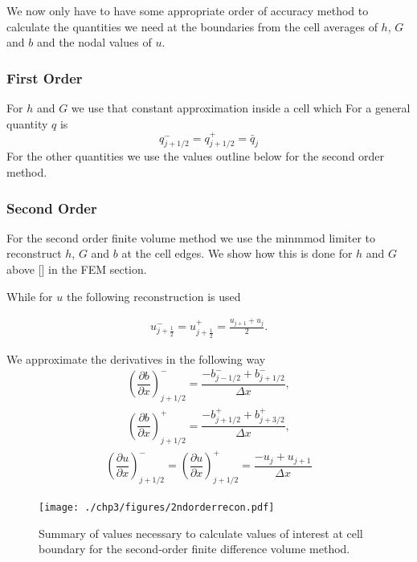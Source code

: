 We now only have to have some appropriate order of accuracy method to calculate the quantities we need at the boundaries from the cell averages of $h$, $G$ and $b$ and the nodal values of $u$.

\subsubsection{First Order}
For $h$ and $G$ we use that constant approximation inside a cell which
For a general quantity $q$ is
\begin{equation}
	q^-_{j + 1/2} = q^+_{j + 1/2} =  \bar{q}_j
\end{equation}
For the other quantities we use the values outline below for the second order method. 


\subsubsection{Second Order}

For the second order finite volume method we use the minmmod limiter to reconstruct $h$, $G$ and $b$ at the cell edges. We show how this is done for $h$ and $G$ above [] in the FEM section. 

While for $u$ the following reconstruction is used

\begin{gather}
u^-_{j + \frac{1}{2}} =  u^+_{j + \frac{1}{2}} =\frac{u_{j+1} + u_j}{2}.
\end{gather}

We approximate the derivatives in the following way
\begin{gather}
\left( \dfrac{\partial b}{\partial x}\right)^-_{j+1/2} = \dfrac{- {b}^-_{j-1/2} + {b}^-_{j+1/2} }{\Delta x},
\end{gather}
\begin{gather}
\left( \dfrac{\partial b}{\partial x}\right)^+_{j+1/2} =\dfrac { - {b}^+_{j+1/2} + {b}^+_{j+3/2} }{\Delta x},
\end{gather}
\begin{gather}
 \left( \dfrac{\partial u}{\partial x}\right)^-_{j+1/2} = \left( \dfrac{\partial u}{\partial x}\right)^+_{j+1/2}= \dfrac{ - u_{j} + u_{j+1} }{\Delta x}
\end{gather}

\begin{figure}
	\centering
	\texttt{[image: ./chp3/figures/2ndorderrecon.pdf]}
	\caption{Summary of values necessary to calculate values of interest at cell boundary for the second-order finite difference volume method.}
	\label{fig:2ndorderrecon}
\end{figure}

